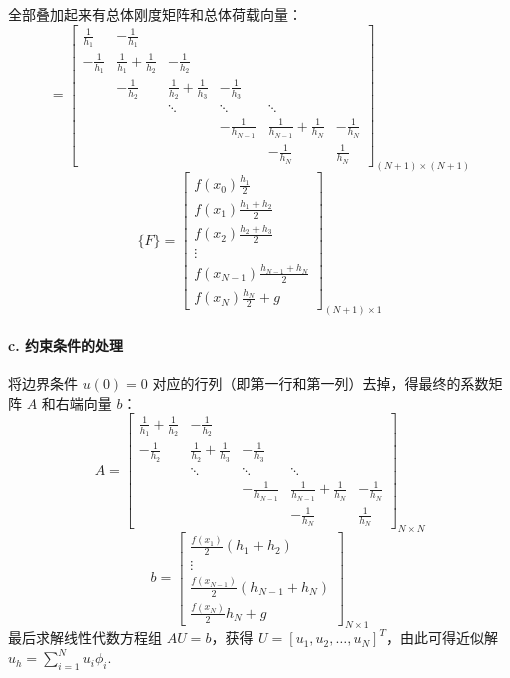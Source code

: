 全部叠加起来有总体刚度矩阵和总体荷载向量：
\begin{equation}
[K] = \begin{bmatrix}
\frac{1}{h_1} & -\frac{1}{h_1} & & & & \\
-\frac{1}{h_1} & \frac{1}{h_1} + \frac{1}{h_2} & -\frac{1}{h_2} & & & \\
& -\frac{1}{h_2} & \frac{1}{h_2} + \frac{1}{h_3} & -\frac{1}{h_3} & & \\
& & \ddots & \ddots & \ddots & \\
& & & -\frac{1}{h_{N-1}} & \frac{1}{h_{N-1}} + \frac{1}{h_N} & -\frac{1}{h_N} \\
& & & & -\frac{1}{h_N} & \frac{1}{h_N}
\end{bmatrix}_{(N+1) \times (N+1)}
\end{equation}
\begin{equation}
\{F\} = \begin{bmatrix}
f(x_0) \frac{h_1}{2} \\
f(x_1) \frac{h_1 + h_2}{2} \\
f(x_2) \frac{h_2 + h_3}{2} \\
\vdots \\
f(x_{N-1}) \frac{h_{N-1} + h_N}{2} \\
f(x_N) \frac{h_N}{2} + g
\end{bmatrix}_{(N+1) \times 1}
\end{equation}

\paragraph{c. 约束条件的处理}
将边界条件 $u(0)=0$ 对应的行列（即第一行和第一列）去掉，得最终的系数矩阵 $A$ 和右端向量 $b$：
\begin{equation}
A = \begin{bmatrix}
\frac{1}{h_1} + \frac{1}{h_2} & -\frac{1}{h_2} & & & \\
-\frac{1}{h_2} & \frac{1}{h_2} + \frac{1}{h_3} & -\frac{1}{h_3} & & \\
& \ddots & \ddots & \ddots & \\
& & -\frac{1}{h_{N-1}} & \frac{1}{h_{N-1}} + \frac{1}{h_N} & -\frac{1}{h_N} \\
& & & -\frac{1}{h_N} & \frac{1}{h_N}
\end{bmatrix}_{N \times N}
\end{equation}
\begin{equation}
b = \begin{bmatrix}
\frac{f(x_1)}{2}(h_1 + h_2) \\
\vdots \\
\frac{f(x_{N-1})}{2}(h_{N-1} + h_N) \\
\frac{f(x_N)}{2}h_N + g
\end{bmatrix}_{N \times 1}
\end{equation}
最后求解线性代数方程组 $AU = b$，获得 $U = [u_1, u_2, \dots, u_N]^T$，由此可得近似解 $u_h = \sum_{i=1}^N u_i \phi_i$.



